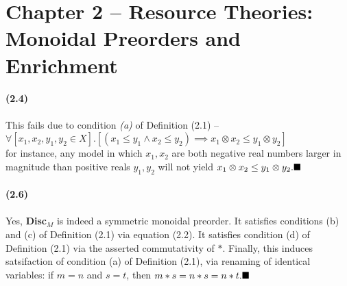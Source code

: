 \documentclass{article}
\begin{document}
\section{Chapter 2 – Resource Theories: Monoidal Preorders and Enrichment}
\textbf{(2.4)}\\
 \\
This fails due to condition \textit{(a)} of Definition (2.1) –\\ 
$\forall \left[ x_1,x_2,y_1,y_2 \in X\right] .\left[ (x_1\leq y_1 \wedge x_2\leq y_2)\implies x_1\otimes x_2 \leq y_1 \otimes y_2 \right] $\\
for instance, any model in which $x_1,x_2$ are both negative real numbers larger in magnitude than positive reals $y_1,y_2$ will not yield $x_1\otimes x_2 \leq y_1\otimes y_2.\hfill\blacksquare$\\
 \\
\textbf{(2.6)}\\
 \\
Yes, \textbf{Disc}$_M$ is indeed a symmetric monoidal preorder. It satisfies conditions (b) and (c) of Definition (2.1) via equation (2.2). It satisfies condition (d) of Definition (2.1) via the asserted commutativity of $*$. Finally, this induces satsifaction of condition (a) of Definition (2.1), via renaming of identical variables: if $m=n$ and $s=t$, then $m*s=n*s=n*t.\hfill\blacksquare$
\end{document}
